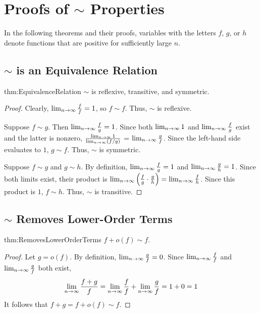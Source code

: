 \appendix
\appendixpage

\section{Proofs of $\sim$ Properties}

{\HdrNote} In the following theorems and their proofs, variables with the letters $f$, $g$, or $h$ denote functions that are positive for sufficiently large $n$.

\subsection{$\sim$ is an Equivalence Relation}

\begin{reptheorem}{thm:EquivalenceRelation}
	$\sim$ is reflexive, transitive, and symmetric.
\end{reptheorem}

\begin{proof}
	Clearly, $\lim_{n \to \infty} \frac{f}{f} = 1$, so $f \sim f$. Thus, $\sim$ is reflexive.
	
	Suppose $f \sim g$. Then $\lim_{n \to \infty} \frac{f}{g} = 1$. Since both $\lim_{n \to \infty} 1$ and $\lim_{n \to \infty} \frac{f}{g}$ exist and the latter is nonzero, $\frac{\lim_{n \to \infty} 1}{\lim_{n \to \infty} (f / g)}$ = $\lim_{n \to \infty} \frac{g}{f}$. Since the left-hand side evaluates to $1$, $g \sim f$. Thus, $\sim$ is symmetric.
	
	Suppose $f \sim g$ and $g \sim h$. By definition, $\lim_{n \to \infty} \frac{f}{g} = 1$ and $\lim_{n \to \infty} \frac{g}{h} = 1$. Since both limits exist, their product is $\lim_{n \to \infty} \left( \frac{f}{g} \cdot \frac{g}{h} \right) = \lim_{n \to \infty} \frac{f}{h}$. Since this product is $1$, $f \sim h$. Thus, $\sim$ is transitive.
\end{proof}

\subsection{$\sim$ Removes Lower-Order Terms}

\begin{reptheorem}{thm:RemovesLowerOrderTerms}
	$f + o(f) \sim f$.
\end{reptheorem}

\begin{proof}
	Let $g = o(f)$. By definition, $\lim_{n \to \infty} \frac{g}{f} = 0$. Since $\lim_{n \to \infty} \frac{f}{f}$ and $\lim_{n \to \infty} \frac{g}{f}$ both exist,
	\begin{align*}
	\lim_{n \to \infty} \frac{f + g}{f} = \lim_{n \to \infty} \frac{f}{f} + \lim_{n \to \infty} \frac{g}{f} = 1 + 0 = 1
	\end{align*}
	It follows that $f + g = f + o(f) \sim f$.
\end{proof}

